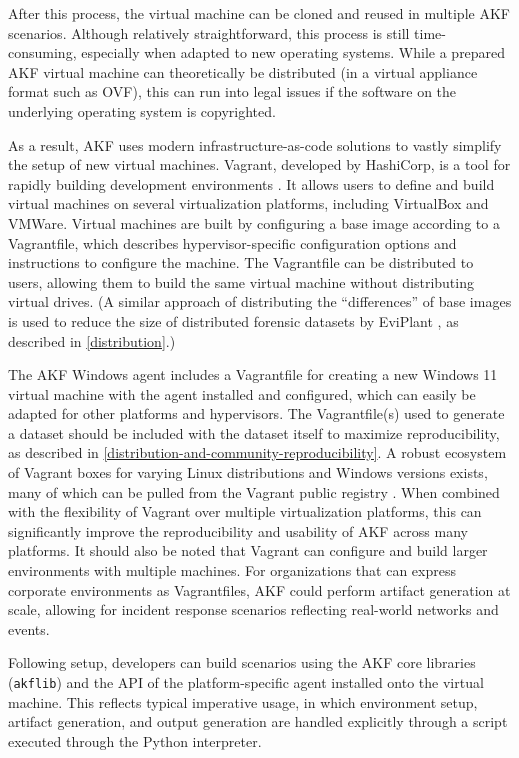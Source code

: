 \documentclass[letterpaper,12pt]{report}
\newcommand{\passthrough}[1]{#1}
\begin{document}
After this process, the virtual machine can be cloned and reused in
multiple AKF scenarios. Although relatively straightforward, this
process is still time-consuming, especially when adapted to new
operating systems. While a prepared AKF virtual machine can
theoretically be distributed (in a virtual appliance format such as
OVF), this can run into legal issues if the software on the underlying
operating system is copyrighted.

As a result, AKF uses modern infrastructure-as-code solutions to vastly
simplify the setup of new virtual machines. Vagrant, developed by
HashiCorp, is a tool for rapidly building development environments
\cite{HashicorpVagrant2025}. It allows users to define and build
virtual machines on several virtualization platforms, including
VirtualBox and VMWare. Virtual machines are built by configuring a base
image according to a Vagrantfile, which describes hypervisor-specific
configuration options and instructions to configure the machine. The
Vagrantfile can be distributed to users, allowing them to build the same
virtual machine without distributing virtual drives. (A similar approach
of distributing the ``differences'' of base images is used to reduce the
size of distributed forensic datasets by EviPlant
\cite{scanlonEviPlantEfficientDigital2017}, as described in
\autoref{distribution}.)

The AKF Windows agent includes a Vagrantfile for creating a new Windows
11 virtual machine with the agent installed and configured, which can
easily be adapted for other platforms and hypervisors. The
Vagrantfile(s) used to generate a dataset should be included with the
dataset itself to maximize reproducibility, as described in \autoref{distribution-and-community-reproducibility}. A robust ecosystem of Vagrant boxes for varying Linux
distributions and Windows versions exists, many of which can be pulled
from the Vagrant public registry
\cite{hashicorpHashiCorpCloudPlatform}. When combined with the
flexibility of Vagrant over multiple virtualization platforms, this can
significantly improve the reproducibility and usability of AKF across
many platforms. It should also be noted that Vagrant can configure and
build larger environments with multiple machines. For organizations that
can express corporate environments as Vagrantfiles, AKF could perform
artifact generation at scale, allowing for incident response scenarios
reflecting real-world networks and events.

Following setup, developers can build scenarios using the AKF core
libraries (\passthrough{\lstinline!akflib!}) and the API of the
platform-specific agent installed onto the virtual machine. This
reflects typical imperative usage, in which environment setup, artifact
generation, and output generation are handled explicitly through a
script executed through the Python interpreter.
\end{document}
